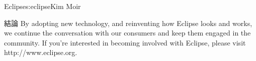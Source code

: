 \begin{aosachapter}{Eclipse}{s:eclipse}{Kim Moir}
\begin{aosasect1}{結論}
By adopting new technology, and reinventing how Eclipse looks and
works, we continue the conversation with our consumers and keep
them engaged in the community. If you're interested in becoming
involved with Eclipse, please visit http://www.eclipse.org.
\end{aosasect1}

\end{aosachapter}
